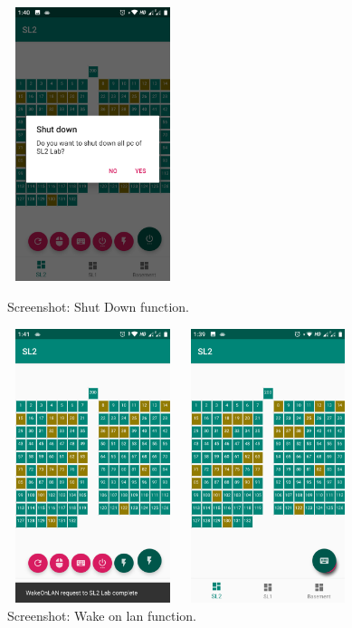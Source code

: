 \documentclass[oneside,a4paper,12pt]{article}
\begin{document}
\begin{figure}[H]
    \centering
        \begin{minipage}{0.46\textwidth}
            \centering
            \includegraphics[width=5cm,height=8cm]{assets/ShutDownConfirm.png}
            \caption{Screenshot: Shut Down function.}
        \end{minipage}\hfill
        \begin{minipage}{0.46\textwidth}
            \centering
            \includegraphics[width=5cm,height=8cm]{assets/WakeOnLan.png}
            \caption{Screenshot: Wake on lan function.}
        \end{minipage}\hfill
        \begin{minipage}{0.46\textwidth}
            \centering
            \includegraphics[width=5cm,height=8cm]{assets/Keybord.png}

\end{minipage}
\end{figure}
\end{document}
